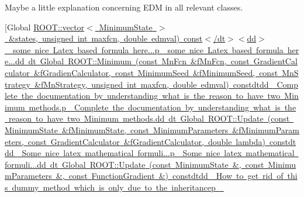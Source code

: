 \begin{DoxyRefList}
\label{todo__todo000017}%
%
Maybe a little explanation concerning E\+DM in all relevant classes. 
\item[Global \mbox{\hyperlink{classROOT_1_1Minuit2_1_1FumiliBuilder_ac0df0ebc275b75e6a6831f102f1753d2}{R\+O\+OT\+:\+:vector$<$ Minimum\+State $>$ \&states, unsigned int maxfcn, double edmval) const$<$/dt$>$$<$dd$>$ \label{todo__todo000004}%
%
some nice Latex based formula here...p \label{todo__todo000016}%
%
some nice Latex based formula here...dd dt Global \mbox{\hyperlink{classROOT_1_1Minuit2_1_1FumiliBuilder_a6e598ea8d57750ec860595ba494bb501}{R\+O\+OT\+:\+:Minimum}} (const \mbox{\hyperlink{classROOT_1_1Minuit2_1_1MnFcn}{Mn\+Fcn}} \&f\+Mn\+Fcn, const \mbox{\hyperlink{classROOT_1_1Minuit2_1_1GradientCalculator}{Gradient\+Calculator}} \&f\+Gradien\+Calculator, const \mbox{\hyperlink{classROOT_1_1Minuit2_1_1MinimumSeed}{Minimum\+Seed}} \&f\+Minimum\+Seed, const \mbox{\hyperlink{classROOT_1_1Minuit2_1_1MnStrategy}{Mn\+Strategy}} \&f\+Mn\+Strategy, unsigned int maxfcn, double edmval) constdtdd \label{todo__todo000003}%
%
Complete the documentation by understanding what is the reason to have two Minimum methods.p \label{todo__todo000015}%
%
Complete the documentation by understanding what is the reason to have two Minimum methods.dd dt Global \mbox{\hyperlink{classROOT_1_1Minuit2_1_1FumiliErrorUpdator_a56adeed7f507548e61a3563182f3caaf}{R\+O\+OT\+:\+:Update}} (const \mbox{\hyperlink{classROOT_1_1Minuit2_1_1MinimumState}{Minimum\+State}} \&f\+Minimum\+State, const \mbox{\hyperlink{classROOT_1_1Minuit2_1_1MinimumParameters}{Minimum\+Parameters}} \&f\+Minimum\+Parameters, const \mbox{\hyperlink{classROOT_1_1Minuit2_1_1GradientCalculator}{Gradient\+Calculator}} \&f\+Gradient\+Calculator, double lambda) constdtdd \label{todo__todo000006}%
%
Some nice latex mathematical formuli...p \label{todo__todo000018}%
%
Some nice latex mathematical formuli...dd dt Global \mbox{\hyperlink{classROOT_1_1Minuit2_1_1FumiliErrorUpdator_ae5ee7f2052c474169dd19ffbc3755bd3}{R\+O\+OT\+:\+:Update}} (const \mbox{\hyperlink{classROOT_1_1Minuit2_1_1MinimumState}{Minimum\+State}} \&, const \mbox{\hyperlink{classROOT_1_1Minuit2_1_1MinimumParameters}{Minimum\+Parameters}} \&, const \mbox{\hyperlink{classROOT_1_1Minuit2_1_1FunctionGradient}{Function\+Gradient}} \&) constdtdd \label{todo__todo000007}%
%
How to get rid of this dummy method which is only due to the inheritancep \label{todo__todo000019}%
$$}}
\end{DoxyRefList}
